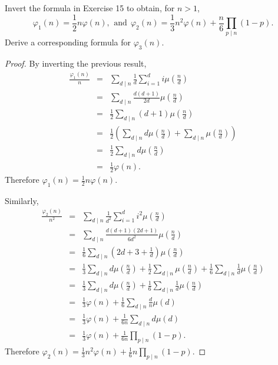 \documentclass[10pt]{amsart}
\begin{document}
\begin{thm}
  Invert the formula in Exercise 15 to obtain, for $n > 1$,
  $$\varphi_1(n) = \frac{1}{2}n\varphi(n),\,\ \text{and}\ \ \varphi_2(n) = \frac{1}{3}n^2\varphi(n) + \frac{n}{6}\prod_{p \mid n}(1 - p) .$$
  Derive a corresponding formula for $\varphi_3(n)$.
  
  \begin{proof}
    By inverting the previous result,
    \begin{eqnarray*}
      \frac{\varphi_1(n)}{n} &=& \sum_{d \mid n} \frac{1}{d}\sum_{i = 1}^d i \mu\left(\frac{n}{d}\right)\\
      &=& \sum_{d \mid n} \frac{d(d+1)}{2d} \mu\left(\frac{n}{d}\right)\\
      &=& \frac{1}{2}\sum_{d \mid n} (d+1) \mu\left(\frac{n}{d}\right)\\
      &=& \frac{1}{2}\left(\sum_{d \mid n} d\mu\left(\frac{n}{d}\right) + \sum_{d \mid n}\mu\left(\frac{n}{d}\right)\right)\\
      &=& \frac{1}{2}\sum_{d \mid n} d\mu\left(\frac{n}{d}\right)\\
      &=& \frac{1}{2}\varphi(n).
    \end{eqnarray*}
    Therefore $\varphi_1(n) = \frac{1}{2}n\varphi(n)$.

    Similarly,
    \begin{eqnarray*}
      \frac{\varphi_2(n)}{n^2} &=& \sum_{d \mid n} \frac{1}{d^2}\sum_{i = 1}^d i^2 \mu\left(\frac{n}{d}\right)\\
      &=& \sum_{d \mid n} \frac{d(d+1)(2d + 1)}{6d^2}\mu\left(\frac{n}{d}\right)\\
      &=& \frac{1}{6}\sum_{d \mid n} \left(2d + 3 + \frac{1}{d}\right) \mu\left(\frac{n}{d}\right)\\
      &=& \frac{1}{3}\sum_{d \mid n} d\mu\left(\frac{n}{d}\right)  + \frac{1}{2}\sum_{d \mid n}\mu\left(\frac{n}{d}\right) + \frac{1}{6}\sum_{d \mid n}\frac{1}{d}\mu\left(\frac{n}{d}\right)\\
      &=& \frac{1}{3}\sum_{d \mid n} d\mu\left(\frac{n}{d}\right)  + \frac{1}{6}\sum_{d \mid n}\frac{1}{d}\mu\left(\frac{n}{d}\right)\\
      &=& \frac{1}{3}\varphi(n)  + \frac{1}{6}\sum_{d \mid n}\frac{d}{n}\mu\left(d\right)\\
      &=& \frac{1}{3}\varphi(n)  + \frac{1}{6n}\sum_{d \mid n}d\mu\left(d\right)\\
      &=& \frac{1}{3}\varphi(n)  + \frac{1}{6n}\prod_{p \mid n}(1 - p).
    \end{eqnarray*}
    Therefore $\varphi_2(n) = \frac{1}{3}n^2\varphi(n)  + \frac{1}{6}n\prod_{p \mid n}(1 - p)$.


\end{proof}
\end{thm}
\end{document}
